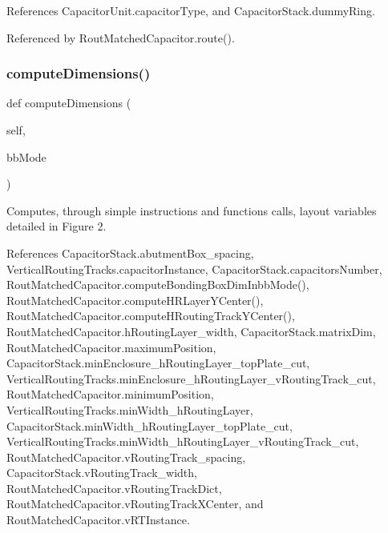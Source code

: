 References Capacitor\+Unit.\+capacitor\+Type, and Capacitor\+Stack.\+dummy\+Ring.



Referenced by Rout\+Matched\+Capacitor.\+route().

\mbox{\label{classpython_1_1capacitorrouted_1_1RoutMatchedCapacitor_ac6ce841e559dc495eb12a6b22cf4bdf9}} 
\subsubsection{\texorpdfstring{compute\+Dimensions()}{computeDimensions()}}
{\footnotesize\ttfamily def compute\+Dimensions (\begin{DoxyParamCaption}\item[{}]{self,  }\item[{}]{bb\+Mode }\end{DoxyParamCaption})}



Computes, through simple instructions and functions calls, layout variables detailed in Figure 2. 



References Capacitor\+Stack.\+abutment\+Box\+\_\+spacing, Vertical\+Routing\+Tracks.\+capacitor\+Instance, Capacitor\+Stack.\+capacitors\+Number, Rout\+Matched\+Capacitor.\+compute\+Bonding\+Box\+Dim\+Inbb\+Mode(), Rout\+Matched\+Capacitor.\+compute\+H\+R\+Layer\+Y\+Center(), Rout\+Matched\+Capacitor.\+compute\+H\+Routing\+Track\+Y\+Center(), Rout\+Matched\+Capacitor.\+h\+Routing\+Layer\+\_\+width, Capacitor\+Stack.\+matrix\+Dim, Rout\+Matched\+Capacitor.\+maximum\+Position, Capacitor\+Stack.\+min\+Enclosure\+\_\+h\+Routing\+Layer\+\_\+top\+Plate\+\_\+cut, Vertical\+Routing\+Tracks.\+min\+Enclosure\+\_\+h\+Routing\+Layer\+\_\+v\+Routing\+Track\+\_\+cut, Rout\+Matched\+Capacitor.\+minimum\+Position, Vertical\+Routing\+Tracks.\+min\+Width\+\_\+h\+Routing\+Layer, Capacitor\+Stack.\+min\+Width\+\_\+h\+Routing\+Layer\+\_\+top\+Plate\+\_\+cut, Vertical\+Routing\+Tracks.\+min\+Width\+\_\+h\+Routing\+Layer\+\_\+v\+Routing\+Track\+\_\+cut, Rout\+Matched\+Capacitor.\+v\+Routing\+Track\+\_\+spacing, Capacitor\+Stack.\+v\+Routing\+Track\+\_\+width, Rout\+Matched\+Capacitor.\+v\+Routing\+Track\+Dict, Rout\+Matched\+Capacitor.\+v\+Routing\+Track\+X\+Center, and Rout\+Matched\+Capacitor.\+v\+R\+T\+Instance.

